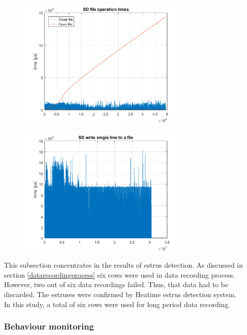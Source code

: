 \documentclass[english,12pt,a4paper,pdftex,elec,utf8]{aaltothesis}
\begin{document}
\begin{figure}[h]
\centering
\includegraphics[width = 0.75\textwidth]{figures/openclosetimes_vanha.png}
\caption{} \label{}
\end{figure}

\begin{figure}[h]
\centering
\includegraphics[width = 0.75\textwidth]{figures/writetimes_vanharauta.png}
\caption{} \label{}
\end{figure}


This subsection concentrates in the results of estrus detection. As discussed in section \ref{datarecordingprocess} six cows were used in data recording process. However, two out of six data recordings failed. Thus, that data had to be discarded. The estruses were confirmed by Heatime estrus detection system. \\
In this study, a total of six cows were used for long period data recording.

\subsubsection{Behaviour monitoring}
\end{document}
